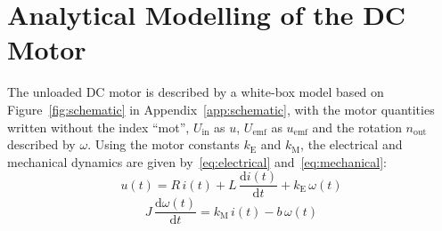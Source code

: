 \section{Analytical Modelling of the DC Motor}\label{sec:modelling}
The unloaded DC motor is described by a white-box model based on
Figure~\ref{fig:schematic} in Appendix~\ref{app:schematic}, with the motor
quantities written without the index \enquote{mot}, $U_\mathrm{in}$ as $u$,
$U_\mathrm{emf}$ as $u_\mathrm{emf}$ and the rotation $n_\mathrm{out}$
described by $\omega$. %
Using the motor constants $k_\mathrm{E}$ and $k_\mathrm{M}$, the electrical and mechanical 
dynamics are given by~\eqref{eq:electrical} and~\eqref{eq:mechanical}:
\begin{equation}
  u(t) = R\,i(t) + L\,\frac{\mathrm{d}i(t)}{\mathrm{d}t} + k_\mathrm{E}\,\omega(t)
  \label{eq:electrical}
\end{equation}
\begin{equation}
  J\,\frac{\mathrm{d}\omega(t)}{\mathrm{d}t} = k_\mathrm{M}\,i(t) - b\,\omega(t)
  \label{eq:mechanical}
\end{equation}

